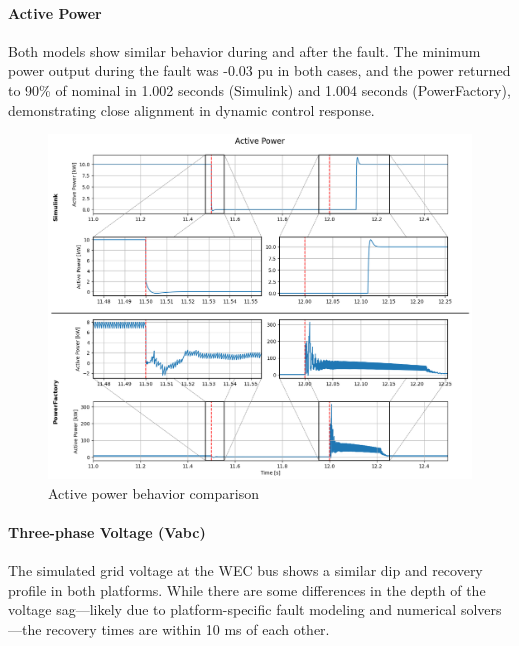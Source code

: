 \documentclass[conference]{IEEEtran}
\begin{document}
    \paragraph{Active Power} Both models show similar behavior during and after the fault. The minimum power output during the fault was -0.03 pu in both cases, and the power returned to 90\% of nominal in 1.002 seconds (Simulink) and 1.004 seconds (PowerFactory), demonstrating close alignment in dynamic control response.
    
    \begin{figure}[t]
        \centering
        \includegraphics[width=1.0\linewidth, frame]{Figs/5_2_1/p.png}
        \caption{Active power behavior comparison}
        \label{fig:P}
    \end{figure}
    
    \paragraph{Three-phase Voltage (Vabc)} The simulated grid voltage at the WEC bus shows a similar dip and recovery profile in both platforms. While there are some differences in the depth of the voltage sag—likely due to platform-specific fault modeling and numerical solvers—the recovery times are within 10 ms of each other.
    
\end{document}
